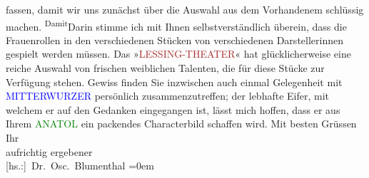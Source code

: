                     fassen, damit wir uns zunächst über die Auswahl aus dem Vorhandenem schlüssig
                    machen. \substVorne{}\textsuperscript{Damit}\substDazwischen{}Darin\substHinten{} stimme ich mit Ihnen selbstverständlich überein, dass die Frauenrollen
                    in den verschiedenen Stücken von verschiedenen Darstellerinnen gespielt werden
                    müssen. Das »\textcolor{brown}{LESSING-THEATER}{}\ledrightnote{\textcolor{brown}{Lessing-Theater}}« hat glücklicherweise eine reiche Auswahl {\pb}von frischen weiblichen Talenten,
                    die für diese Stücke zur Verfügung stehen. Gewiss finden Sie inzwischen auch
                    einmal Gelegenheit mit \textcolor{blue}{MITTERWURZER}{}\ledrightnote{\textcolor{blue}{Friedrich Mitterwurzer}} persönlich zusammenzutreffen; der lebhafte
                    Eifer, mit welchem er auf den Gedanken eingegangen ist, lässt mich hoffen, dass
                    er aus Ihrem \textcolor{green}{ANATOL}{}\ledrightnote{\textcolor{green}{Anatol}}
                    ein packendes Characterbild schaffen wird.\pend
           \pstart
           Mit besten Grüssen Ihr{\\[\baselineskip]} aufrichtig ergebener{\\[\baselineskip]}\spacefill\mbox{{[}hs.:{]} Dr. Osc. Blumenthal}\pend
           \leftskip=0em{}\endnumbering{}  
      